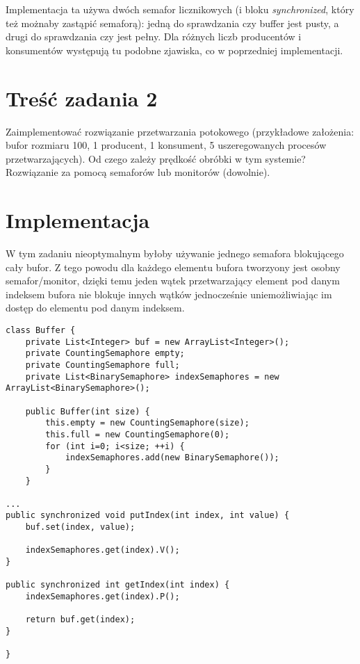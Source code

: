 \documentclass{article}
\begin{document}
Implementacja ta używa dwóch semafor licznikowych (i bloku \textit{synchronized}, który też możnaby zastąpić semaforą): 
jedną do sprawdzania czy buffer jest pusty, a drugi do sprawdzania czy jest pełny. Dla różnych liczb producentów i
konsumentów występują tu podobne zjawiska, co w poprzedniej implementacji.

\section{Treść zadania 2}

Zaimplementować rozwiązanie przetwarzania potokowego (przykładowe założenia: bufor rozmiaru 100, 1 producent, 
1 konsument, 5 uszeregowanych procesów przetwarzających). Od czego zależy prędkość obróbki w tym systemie? 
Rozwiązanie za pomocą semaforów lub monitorów (dowolnie).

\section{Implementacja}

W tym zadaniu nieoptymalnym byłoby używanie jednego semafora blokującego cały bufor. Z tego powodu
dla każdego elementu bufora tworzyony jest osobny semafor/monitor, dzięki temu jeden wątek przetwarzający
element pod danym indeksem bufora nie blokuje innych wątków jednocześnie uniemożliwiając im dostęp do
elementu pod danym indeksem.

\begin{verbatim}
class Buffer {
    private List<Integer> buf = new ArrayList<Integer>();
    private CountingSemaphore empty;
    private CountingSemaphore full;
    private List<BinarySemaphore> indexSemaphores = new ArrayList<BinarySemaphore>();

    public Buffer(int size) {
        this.empty = new CountingSemaphore(size);
        this.full = new CountingSemaphore(0);
        for (int i=0; i<size; ++i) {
            indexSemaphores.add(new BinarySemaphore());
        }
    }

...
public synchronized void putIndex(int index, int value) {
    buf.set(index, value);

    indexSemaphores.get(index).V();
}

public synchronized int getIndex(int index) {
    indexSemaphores.get(index).P();

    return buf.get(index);
}

}
\end{verbatim}
\end{document}
